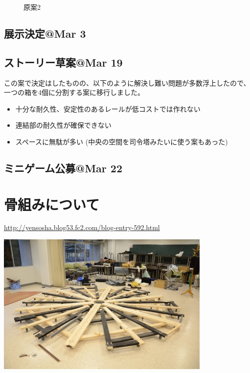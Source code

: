 \documentclass{jsarticle}
\begin{document}
\begin{figure}[htbp]
{        \label{fig:質問1}
    }
    \caption{原案2}
    \label{figs:原案2}
\end{figure}

\clearpage

\subsection{展示決定@Mar 3}
\subsection{ストーリー草案@Mar 19}

\clearpage

この案で決定はしたものの、以下のように解決し難い問題が多数浮上したので、一つの箱を4個に分割する案に移行しました。

\begin{itemize}
    \item 十分な耐久性、安定性のあるレールが低コストでは作れない
    \item 連結部の耐久性が確保できない
    \item スペースに無駄が多い (中央の空間を司令塔みたいに使う案もあった)
\end{itemize}

\subsection{ミニゲーム公募@Mar 22}

\section{骨組みについて}

\url{http://yensosha.blog53.fc2.com/blog-entry-592.html}

\includegraphics[]{images/base_bone_1.jpg}
\end{document}
